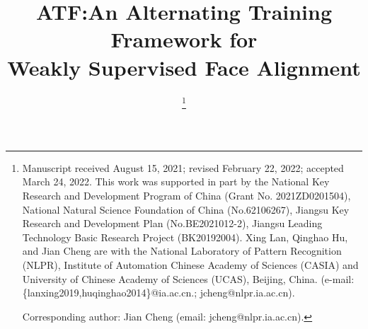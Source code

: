 \documentclass[journal,transmag]{IEEEtran}
\begin{document}
%
\title{ATF:An Alternating Training Framework for \\ Weakly Supervised Face Alignment}




\author{
\thanks{Manuscript received August 15, 2021; revised February 22, 2022; accepted March 24, 2022.
This work was supported in part by the National Key Research and Development Program of China (Grant No. 2021ZD0201504),
National Natural Science Foundation of China (No.62106267),
Jiangsu Key Research and Development Plan (No.BE2021012-2), 
Jiangsu Leading Technology Basic Research Project (BK20192004).
Xing Lan, Qinghao Hu, and Jian Cheng are with the National Laboratory of Pattern Recognition (NLPR), 
Institute of Automation Chinese Academy of Sciences (CASIA) 
and University of Chinese Academy of Sciences (UCAS), Beijing, China. 
(e-mail: \{lanxing2019,huqinghao2014\}@ia.ac.cn.; jcheng@nlpr.ia.ac.cn).

Corresponding author: Jian Cheng (email: jcheng@nlpr.ia.ac.cn).}}


\end{document}
